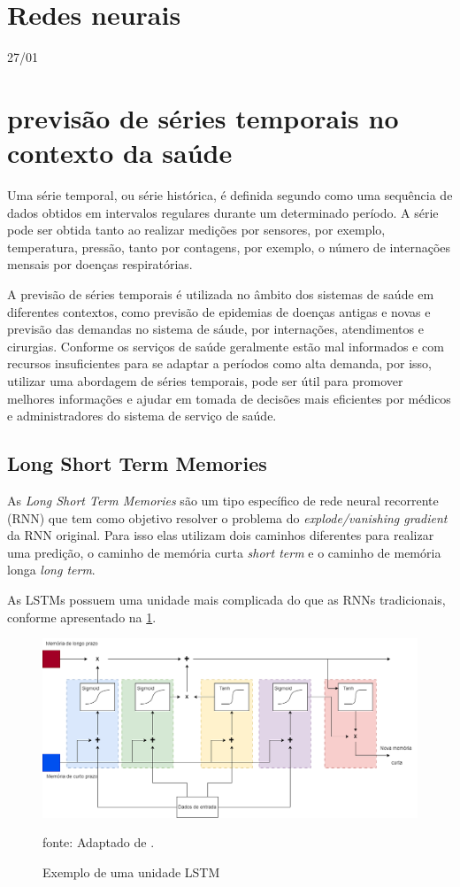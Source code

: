 \documentclass[
  12pt,		%
  a4paper,	%
  openright,%
  oneside,	%
  chapter=TITLE,		%
  section=TITLE,		%
  english,	%
  french,	%
  spanish,	%
  brazil	%
]{abntex2}
\begin{document}
    \section{Redes neurais}
    27/01

    \section{previsão de séries temporais no contexto da saúde}
    Uma série temporal, ou série histórica, é definida segundo \cite[]{series_temporais}
    como uma sequência de dados obtidos em intervalos regulares durante um determinado período.
    A série pode ser obtida tanto ao realizar medições por sensores, por exemplo, temperatura, pressão, 
    tanto por contagens, por exemplo, o número de internações mensais por doenças respiratórias.

    A previsão de séries temporais é utilizada no âmbito dos sistemas de saúde em diferentes contextos, como 
    previsão de epidemias de doenças antigas e novas e previsão das demandas no sistema de sáude, por internações, atendimentos e cirurgias.
    Conforme \cite[]{forcasting_health} os serviços de saúde geralmente estão mal informados 
    e com recursos insuficientes para se adaptar a períodos como alta demanda, por isso, utilizar uma abordagem
    de séries temporais, pode ser útil para promover melhores informações e ajudar em tomada de 
    decisões mais eficientes por médicos e administradores do sistema de serviço de saúde.

    \subsection{Long Short Term Memories}
    As \textit{Long Short Term Memories} são um tipo específico de rede neural recorrente (RNN) que tem como objetivo
    resolver o problema do \textit{explode/vanishing gradient} da RNN original. Para isso elas utilizam dois caminhos
    diferentes para realizar uma predição, o caminho de memória curta \textit{short term} e o caminho de memória longa
    \textit{long term}.

    As LSTMs possuem uma unidade mais complicada do que as RNNs tradicionais, conforme apresentado na \ref*{lstm_unit}.
    \begin{figure}[h]
        \centering
        \caption{Exemplo de uma unidade LSTM}
        \includegraphics[width=16cm]{../reports/figures/LSTM_unit.png}
        \label{lstm_unit}
        \par
        {\small fonte: Adaptado de \cite[]{statquest}.}
    \end{figure}
\end{document}
